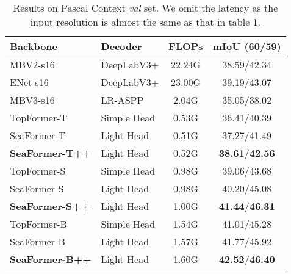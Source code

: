 \begin{table}
\centering
    \begin{tabular}{ll |c | c}
        \hline

        \hline

        \hline
    Backbone     & Decoder     & FLOPs     &mIoU (60/59) \\
        \hline

        \hline
        \hline
    MBV2-s16 &  DeepLabV3+  &  22.24G &  38.59/42.34 \\
    ENet-s16 & DeepLabV3+  & 23.00G & 39.19/43.07 \\
        \hline

        \hline
        \hline
    MBV3-s16 &  LR-ASPP &  2.04G & 35.05/38.02 \\
    TopFormer-T  &  Simple Head &  0.53G  & 36.41/40.39   \\
    SeaFormer-T  &  Light Head &  0.51G   & 37.27/41.49  \\
    \textbf{SeaFormer-T++}  &  Light Head &  0.52G   & \textbf{38.61}/\textbf{42.56}  \\
        \hline

        \hline
        \hline    
    TopFormer-S &  Simple Head &  0.98G   & 39.06/43.68   \\
    SeaFormer-S  & Light Head &  0.98G  & 40.20/45.08   \\
    \textbf{SeaFormer-S++}  & Light Head &  1.00G  & \textbf{41.44}/\textbf{46.31}   \\
        \hline

        \hline
        \hline   
    TopFormer-B & Simple Head &  1.54G   & 41.01/45.28   \\
    SeaFormer-B   & Light Head & 1.57G    & 41.77/45.92   \\
    \textbf{SeaFormer-B++}   & Light Head & 1.60G    & \textbf{42.52}/\textbf{46.40}   \\
        \hline

        \hline

        \hline
  \end{tabular}
\caption{Results on Pascal Context \textit{val} set. We omit the latency as the input resolution is almost the same as that in table 1.}
\label{pascal_table}

\end{table}
